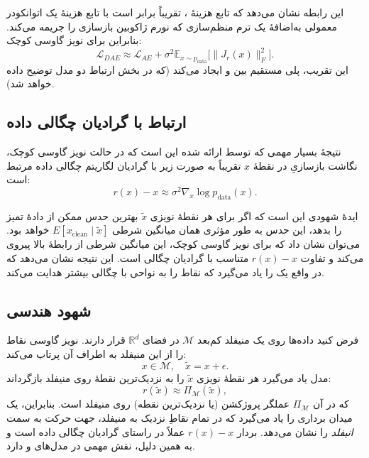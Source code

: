 \documentclass{article}
\begin{document}
این رابطه نشان می‌دهد که تابع هزینهٔ ، تقریباً برابر است با تابع هزینهٔ یک اتوانکودر معمولی به‌اضافهٔ یک ترم منظم‌سازی که نورم ژاکوبین بازسازی را جریمه می‌کند. بنابراین برای نویز گاوسی کوچک:
\begin{equation}
	\mathcal{L}_{DAE}
	\approx
	\mathcal{L}_{AE}
	+
	\sigma^2
	\mathbb{E}_{x \sim p_{\text{data}}}
	\big[
	\|J_r(x)\|_F^2
	\big].
\end{equation}
این تقریب، پلی مستقیم بین  و  ایجاد می‌کند (که در بخش ارتباط دو مدل توضیح داده خواهد شد).

\subsection{ارتباط  با گرادیان چگالی داده}

نتیجهٔ بسیار مهمی که توسط  ارائه شده این است که در حالت نویز گاوسی کوچک، نگاشت بازسازیِ  در نقطهٔ $x$ تقریباً به صورت زیر با گرادیان لگاریتم چگالی داده مرتبط است:
\begin{equation}
	r(x) - x \approx \sigma^2 \nabla_x \log p_{\text{data}}(x).
\end{equation}

ایدهٔ شهودی این است که اگر  برای هر نقطهٔ نویزی $\tilde{x}$ بهترین حدس ممکن از دادهٔ تمیز را بدهد، این حدس به طور مؤثری همان میانگین شرطی $E[x_{\text{clean}} \mid \tilde{x}]$ خواهد بود. می‌توان نشان داد که برای نویز گاوسی کوچک، این میانگین شرطی از رابطهٔ بالا پیروی می‌کند و تفاوت $r(x)-x$ متناسب با گرادیان چگالی است. این نتیجه نشان می‌دهد که  در واقع یک  را یاد می‌گیرد که نقاط را به نواحی با چگالی بیشتر هدایت می‌کند.

\subsection{شهود هندسی }

فرض کنید داده‌ها روی یک منیفلد کم‌بعد $\mathcal{M}$ در فضای $\mathbb{R}^d$ قرار دارند. نویز گاوسی نقاط را از این منیفلد به اطراف آن پرتاب می‌کند:
\begin{equation}
	x \in \mathcal{M}, \quad \tilde{x} = x + \epsilon.
\end{equation}
مدل  یاد می‌گیرد هر نقطهٔ نویزی $\tilde{x}$ را به نزدیک‌ترین نقطهٔ روی منیفلد بازگرداند:
\begin{equation}
	r(\tilde{x}) \approx \Pi_{\mathcal{M}}(\tilde{x}),
\end{equation}
که در آن $\Pi_{\mathcal{M}}$ عملگر پروژکشن (یا نزدیک‌ترین نقطه) روی منیفلد است. بنابراین،  یک میدان برداری را یاد می‌گیرد که در تمام نقاطِ نزدیک به منیفلد، جهت حرکت به سمت \emph{انیفلد} را نشان می‌دهد. بردار $r(x)-x$ عملاً در راستای گرادیان چگالی داده است و به همین دلیل،  نقش مهمی در مدل‌های  و  دارد.
\end{document}
